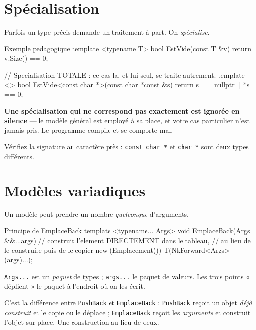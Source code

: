 \section{Spécialisation}

Parfois un type précis demande un traitement à part. On \emph{spécialise}.

\begin{nkcode}{Exemple pedagogique}
template <typename T>
bool EstVide(const T &v) { return v.Size() == 0; }

// Specialisation TOTALE : ce cas-la, et lui seul, se traite autrement.
template <>
bool EstVide<const char *>(const char *const &s) { return s == nullptr || *s == 0; }
\end{nkcode}

\begin{nkpiege}
\textbf{Une spécialisation qui ne correspond pas exactement est ignorée en
silence} --- le modèle général est employé à sa place, et votre cas particulier
n'est jamais pris. Le programme compile et se comporte mal.

Vérifiez la signature au caractère près : \texttt{const char *} et
\texttt{char *} sont deux types différents.
\end{nkpiege}

\section{Modèles variadiques}

Un modèle peut prendre un nombre \emph{quelconque} d'arguments.

\begin{nkcode}{Principe de EmplaceBack}
template <typename... Args>
void EmplaceBack(Args &&...args) {
    // construit l'element DIRECTEMENT dans le tableau,
    // au lieu de le construire puis de le copier
    new (Emplacement()) T(NkForward<Args>(args)...);
}
\end{nkcode}

\texttt{Args...} est un \emph{paquet} de types ; \texttt{args...} le paquet de
valeurs. Les trois points « déplient » le paquet à l'endroit où on les écrit.

\begin{nkretenir}
C'est la différence entre \texttt{PushBack} et \texttt{EmplaceBack} :
\texttt{PushBack} reçoit un objet \emph{déjà construit} et le copie ou le
déplace ; \texttt{EmplaceBack} reçoit les \emph{arguments} et construit l'objet
sur place. Une construction au lieu de deux.
\end{nkretenir}

